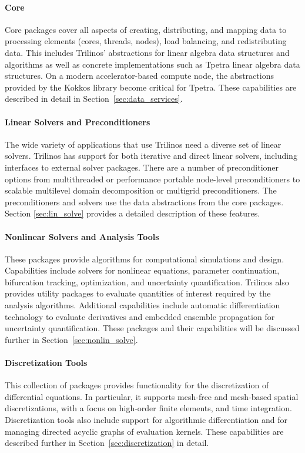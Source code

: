 \paragraph{Core} Core packages cover all aspects of creating, distributing, and mapping data to processing elements (cores, threads, nodes), load balancing, and redistributing data. This includes Trilinos' abstractions for linear algebra data structures and algorithms as well as concrete implementations such as Tpetra linear algebra data structures. On a modern accelerator-based compute node, the abstractions provided by the Kokkos library become critical for Tpetra. These capabilities are described in detail in Section~\ref{sec:data_services}.

\paragraph{Linear Solvers and Preconditioners} The wide variety of applications that use Trilinos need a diverse set of linear solvers. Trilinos has support for both iterative and direct linear solvers, including interfaces to external solver packages. There are a number of preconditioner options from multithreaded or performance portable node-level preconditioners to scalable multilevel domain decomposition or multigrid preconditioners. The preconditioners and solvers use the data abstractions from the core packages. Section \ref{sec:lin_solve} provides a detailed description of these features.

\paragraph{Nonlinear Solvers and Analysis Tools} These packages provide algorithms for computational simulations and design. Capabilities include solvers for nonlinear equations, parameter continuation, bifurcation tracking, optimization, and uncertainty quantification. Trilinos also provides utility packages to evaluate quantities of interest required by the analysis algorithms. Additional capabilities include automatic differentiation technology to evaluate derivatives and embedded ensemble propagation for uncertainty quantification. These packages and their capabilities will be discussed further in Section~\ref{sec:nonlin_solve}.

\paragraph{Discretization Tools} This collection of packages provides functionality for the discretization of differential equations. In particular, it supports mesh-free and mesh-based spatial discretizations, with a focus on high-order finite elements, and time integration. Discretization tools also include support for algorithmic differentiation and for managing directed acyclic graphs of evaluation kernels. These capabilities are described further in Section~\ref{sec:discretization} in detail.

